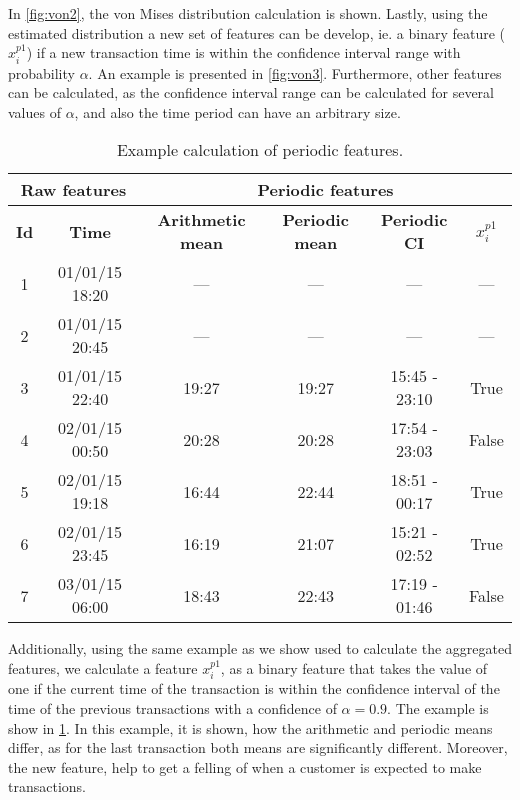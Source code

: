 	In \figurename{ \ref{fig:von2}}, the von Mises distribution calculation is shown.
	Lastly, using the estimated distribution a new set of features can be develop, ie. a binary 	
	feature ($x_i^{p1}$) if a new transaction time is within the confidence interval range with 
	probability 	$\alpha$.	An example is presented in \figurename{ \ref{fig:von3}}. 
	Furthermore, other features can be calculated, as the confidence interval range can be calculated 
	for several values of $\alpha$, and also the time period can have an arbitrary size.

	\begin{table}[!t]
   \caption{Example calculation of periodic features.}
   \label{tab:agg_features_example2}
   \centering
   \begin{tabular}{|c c | c c c c|}
   \hline
   \multicolumn{2}{|c|}{\textbf{Raw features}} & \multicolumn{4}{c|}{\textbf{Periodic features}} 
		\\  \hline
   \textbf{Id} & \textbf{Time} & \textbf{Arithmetic mean} & \textbf{Periodic mean} & 
		\textbf{Periodic CI} & $x_i^{p1}$ \\
   \hline
		1& 01/01/15 18:20& --- & ---	 &	--- & ---\\
		2& 01/01/15 20:45& --- & ---	 &---	 & ---\\
		3& 01/01/15 22:40& 19:27 & 19:27 & 15:45 - 23:10 & True \\
		4& 02/01/15 00:50& 20:28 & 20:28 & 17:54 - 23:03 & False\\
		5& 02/01/15 19:18& 16:44 & 22:44 & 18:51 - 00:17 & True\\
		6& 02/01/15 23:45& 16:19 & 21:07 & 15:21 - 02:52 & True\\
		7& 03/01/15 06:00& 18:43 & 22:43 & 17:19 - 01:46 & False\\
   \hline
   \end{tabular}
   \end{table}

	Additionally, using the same example as we show used to calculate the aggregated features, 
	we calculate a feature $x_i^{p1}$, as a binary feature that takes the value of one if the current 
	time of the transaction is within the confidence interval of the time of the previous 
	transactions with a confidence of $\alpha=0.9$. The example is show in \tablename{ 
	\ref{tab:agg_features_example2}}. In this example, it is shown, how the arithmetic and periodic 
	means differ, as for the last transaction both means are significantly different. Moreover, the 
	new feature, help to get a felling of when a customer is expected to make transactions.
	
